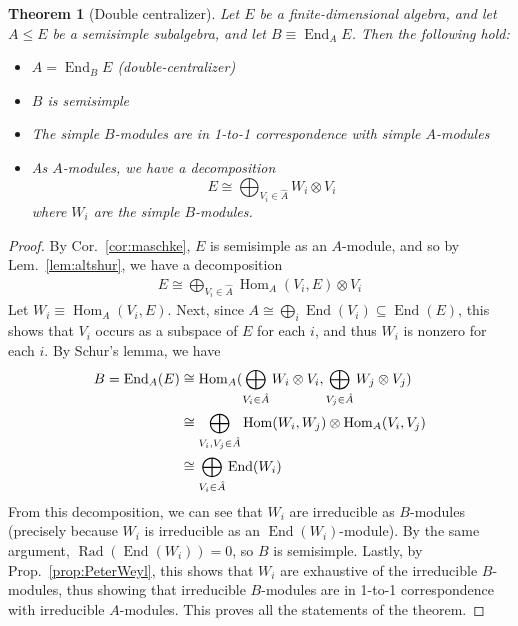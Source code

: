 \documentclass[11pt]{article}
\newtheorem{thm}{Theorem}
\theoremstyle{definition}
\newcommand{\End}{\operatorname{End}}
\newcommand{\Hom}{\operatorname{Hom}}
\newcommand{\Rad}{\operatorname{Rad}}
\begin{document}
\begin{thm}[Double centralizer]\label{thm:doublecentralizer}
Let $E$ be a finite-dimensional algebra, and let $A\leq E$ be a semisimple
subalgebra, and let $B \equiv \End_AE$. Then the following hold:
\begin{itemize}
  \item $A = \End_BE$ (double-centralizer)
  \item $B$ is semisimple
  \item The simple $B$-modules are in 1-to-1 correspondence with simple $A$-modules
  \item As $A$-modules, we have a decomposition
    \begin{equation}
      E \cong \bigoplus_{V_i \in \hat A} W_i \otimes V_i
    \end{equation}
    where $W_i$ are the simple $B$-modules.
\end{itemize}
\end{thm}

\begin{proof}
  By Cor.~\ref{cor:maschke}, $E$ is semisimple as an $A$-module, and so by
  Lem.~\ref{lem:altshur}, we have a decomposition
  \begin{align}
    E \cong \bigoplus_{V_i \in \hat A}\Hom_A(V_i, E) \otimes V_i
  \end{align}
  Let
  $W_i \equiv \Hom_A(V_i, E)$.
  Next, since $A \cong \bigoplus_{i}\End(V_i) \subseteq \End(E)$, this shows
  that $V_i$ occurs as a subspace of $E$ for each $i$, and thus $W_i$
  is nonzero for each $i$.   By
  Schur's lemma, we have
  \begin{align}
    B = \End_A(E) &\cong \Hom_A(\bigoplus_{V_i \in \hat A}W_i \otimes V_i, \bigoplus_{V_j \in \hat A}W_j \otimes V_j) \notag\\
                  &\cong \bigoplus_{V_i,V_j \in \hat A}\Hom(W_i, W_j)\otimes \Hom_A(V_i, V_j) \notag\\
    &\cong \bigoplus_{V_i \in \hat A}\End(W_i)
  \end{align}
  From this decomposition, we can see that $W_i$ are irreducible as $B$-modules
  (precisely because $W_i$ is irreducible as an $\End(W_i)$-module). By the same
  argument, $\Rad(\End(W_i)) = 0$, so $B$ is semisimple. Lastly, by
  Prop.~\ref{prop:PeterWeyl}, this shows that $W_i$ are exhaustive of the
  irreducible $B$-modules, thus showing that irreducible $B$-modules are in
  1-to-1 correspondence with irreducible $A$-modules. This proves all the
  statements of the theorem.
\end{proof}
\end{document}

